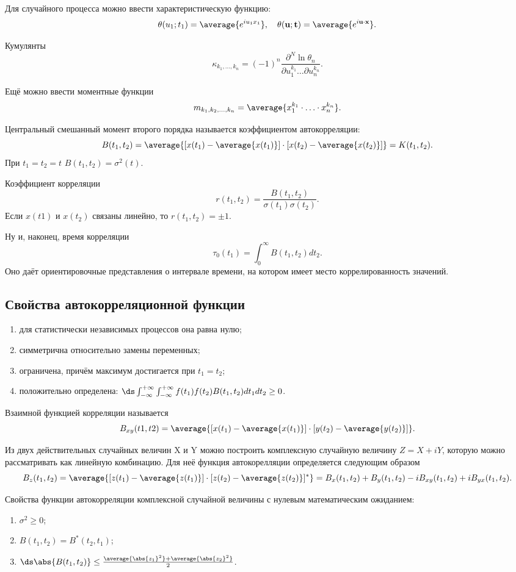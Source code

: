 Для случайного процесса можно ввести характеристическую функцию:
\[
    \theta(u_1;t_1) = \average{e^{iu_1x_1}},\quad
    \theta(\mathbf{u};\mathbf{t}) = \average{e^{i\mathbf{u}\cdot\mathbf{x}}}.
\]

Кумулянты
\[
    \kappa_{k_1,\ldots,k_n} = (-1)^n\frac{\partial^N\ln\theta_n}
    {\partial u_1^{k_1} \ldots \partial u_n^{k_n}}.
\]

Ещё можно ввести моментные функции
\[
    m_{k_1,k_2,\ldots,k_n} = \average{x_1^{k_1}\cdot\ldots\cdot x_n^{k_n}}.
\]

Центральный смешанный момент второго порядка называется коэффициентом
автокорреляции:
\[
    B(t_1, t_2) = \average{[x(t_1) - \average{x(t_1)}]\cdot
    [x(t_2) - \average{x(t_2)}]} = K(t_1,t_2).
\]
При \( t_1 = t_2 = t \) \( B(t_1, t_2) = \sigma^2(t) \).

Коэффициент корреляции
\[
    r(t_1, t_2) = \frac{B(t_1,t_2)}{\sigma(t_1)\sigma(t_2)}.
\]
Если \( x(t1) \) и \( x(t_2) \) связаны линейно, то \( r(t_1, t_2) = \pm 1 \).

Ну и, наконец, время корреляции
\[
    \tau_0(t_1) = \int_0^\infty B(t_1,t_2) dt_2.
\]
Оно даёт ориентировочные представления о интервале времени, на котором имеет
место коррелированность значений.

\subsection{Свойства автокорреляционной функции}
\begin{enumerate}
    \item для статистически независимых процессов она равна нулю;
    \item симметрична относительно замены переменных;
    \item ограничена, причём максимум достигается при \( t_1 = t_2 \);
    \item положительно определена:
        \( \ds
        \int_{-\infty}^{+\infty}\int_{-\infty}^{+\infty}f(t_1)f(t_2)B(t_1,t_2)
        dt_1 dt_2 \ge 0 \).
\end{enumerate}

Взаимной функцией корреляции называется
\[
    B_{xy}(t1,t2) = \average{[x(t_1) - \average{x(t_1)}]\cdot
    [y(t_2) - \average{y(t_2)}]}.
\]

Из двух действительных случайных величин X и Y можно построить комплексную
случайную величину \( Z = X + iY \), которую можно рассматривать как линейную
комбинацию. Для неё функция автокорелляции определяется следующим образом
\[
    B_z(t_1, t_2) = \average{[z(t_1) - \average{z(t_1)}]\cdot
    [z(t_2) - \average{z(t_2)}]^*} =
    B_x(t_1, t_2) + B_y(t_1,t_2) - iB_{xy}(t_1, t_2) + iB_{yx}(t_1,t_2).
\]

Свойства функции автокорреляции комплексной случайной величины с нулевым
математическим ожиданием:
\begin{enumerate}
    \item \( \sigma^2 \ge 0 \);
    \item \( B(t_1,t_2) = B^*(t_2,t_1) \);
    \item \( \ds \abs{B(t_1,t_2)} \le \frac{\average{\abs{z_1}^2} +
        \average{\abs{z_2}^2}}{2} \).
\end{enumerate}
